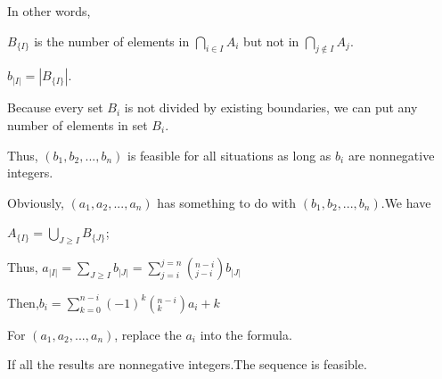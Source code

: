 \documentclass[12pt,a4]{article}
\begin{document}
     In other words,
     \begin{center}
      $B_{\{I\}}$ is the number of elements in $\bigcap \limits_{i \in I} A_i$ but not in $\bigcap \limits_{j\notin I } A_j$.
     
      $b_{|I|}=|B_{\{I\}}|.$
     \end{center}
     
     Because every set $B_i$ is not divided by existing boundaries, we can put any number of elements in set $B_i$.
     
     Thus, $(b_1,b_2,...,b_n)$ is feasible for all situations as long as $b_i$ are nonnegative integers.

     Obviously, $(a_1,a_2,...,a_n)$ has something to do with $(b_1,b_2,...,b_n)$.We have
     \begin{center}
     $A_{\{I\}}=\bigcup \limits_{J\ge I}B_{\{J\}}$;
     
     Thus, $a_{|I|}=\sum \limits_{J\ge I}b_{|J|}=\sum \limits_{j=i}^{j=n} (_{j-i}^{n-i}) b_{|J|}$
     
     Then,$b_i=\sum \limits_{k=0}^{n-i} (-1)^k (_{k}^{n-i} )a_i+k$
     
     \end{center}
     
     For $(a_1,a_2,...,a_n)$, replace the $a_i$ into the formula.
     
     If all the results are nonnegative integers.The sequence is feasible.
     
 
\end{document}
